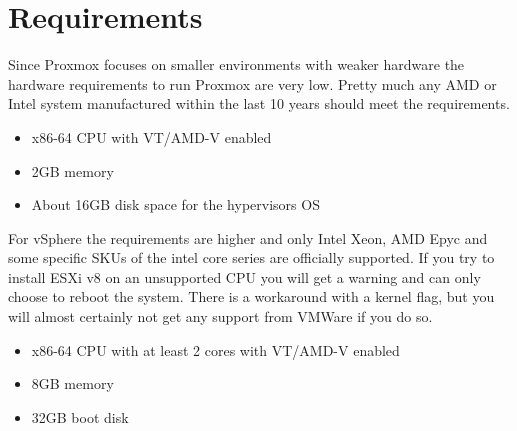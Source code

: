 \section{Requirements}

Since Proxmox focuses on smaller environments with weaker hardware the hardware requirements to run Proxmox are very low. Pretty much any AMD or Intel system manufactured within the last 10 years should meet the requirements.

\begin{itemize}
	\item x86-64 CPU with VT/AMD-V enabled
	\item 2GB memory
	\item About 16GB disk space for the hypervisors OS
\end{itemize}

For vSphere the requirements are higher and only Intel Xeon, AMD Epyc and some specific SKUs of the intel core series are officially supported. 
If you try to install ESXi v8 on an unsupported CPU you will get a warning and can only choose to reboot the system. There is a workaround with a kernel flag, but you will almost certainly not get any support from VMWare if you do so. 

\begin{itemize}
	\item x86-64 CPU with at least 2 cores with VT/AMD-V enabled
	\item 8GB memory
	\item 32GB boot disk
\end{itemize}